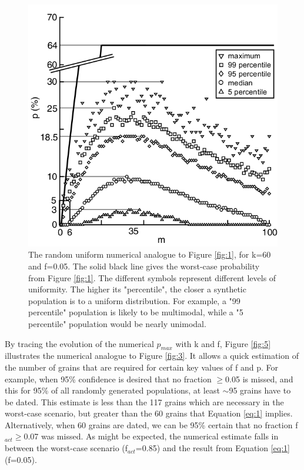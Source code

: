\documentclass[12]{article}
\begin{document}
\begin{figure}[here]
  \centering
  \includegraphics[width = 8in]{fig4.jpg}
   \caption{The random uniform numerical analogue to Figure \ref{fig:1},
for  k=60 and  f=0.05.   The  solid black  line  gives the  worst-case
probability from  Figure \ref{fig:1}. The  different symbols represent
different  levels of  uniformity.   The higher  its "percentile",  the
closer  a synthetic  population  is to  a  uniform distribution.   For
example,  a "99  percentile" population  is likely  to  be multimodal,
while a "5 percentile" population would be nearly unimodal.}
  \label{fig:4}
\end{figure}

By  tracing the evolution  of the  numerical $p_{max}$  with k  and f,
Figure  \ref{fig:5}  illustrates  the  numerical  analogue  to  Figure
\ref{fig:3}.  It  allows a  quick estimation of  the number  of grains
that are  required for certain  key values of  f and p.   For example,
when 95\% confidence is desired that no fraction $\geq$0.05 is missed,
and  this for  95\% of  all randomly  generated populations,  at least
$\sim$95 grains have to be dated.   This estimate is less than the 117
grains  which are necessary  in the  worst-case scenario,  but greater
than the  60 grains that Equation  \ref{eq:1} implies.  Alternatively,
when 60  grains are  dated, we  can be 95\%  certain that  no fraction
f$_{act} \geq$0.07  was missed.  As  might be expected,  the numerical
estimate falls in between the worst-case scenario (f$_{act}$=0.85) and
the result from Equation \ref{eq:1} (f=0.05).
\end{document}
